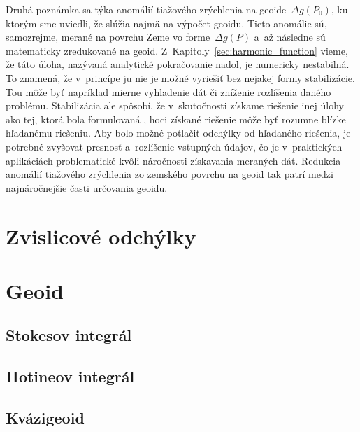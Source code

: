 \documentclass[a4paper,12pt]{book}
\begin{document}
Druhá poznámka sa týka anomálií tiažového zrýchlenia na geoide~$\Delta g(P_0)$, 
ku ktorým sme uviedli, že slúžia najmä na výpočet geoidu.  Tieto anomálie sú, 
samozrejme, merané na povrchu Zeme vo forme~$\Delta g(P)$ a~až následne sú 
matematicky zredukované na geoid.  Z~Kapitoly~\ref{sec:harmonic_function} 
vieme, že táto úloha, nazývaná analytické pokračovanie nadol, je numericky 
nestabilná.  To znamená, že v~princípe ju nie je možné vyriešiť bez nejakej 
formy stabilizácie.  Tou môže byť napríklad mierne vyhladenie dát či zníženie 
rozlíšenia daného problému.  Stabilizácia ale spôsobí, že v~skutočnosti získame 
riešenie inej úlohy ako tej, ktorá bola formulovaná 
\parencite{SansoGeodeticBoundaryValueProblem}, hoci získané riešenie môže byť 
rozumne blízke hľadanému riešeniu.  Aby bolo možné potlačiť odchýlky od 
hľadaného riešenia, je potrebné zvyšovať presnosť a~rozlíšenie vstupných 
údajov, čo je v~praktických aplikáciách problematické kvôli náročnosti 
získavania meraných dát.  Redukcia anomálií tiažového zrýchlenia zo zemského 
povrchu na geoid tak patrí medzi najnáročnejšie časti určovania geoidu.






\section{Zvislicové odchýlky}
\label{sec:deflections}






\section{Geoid}
\label{sec:geoid}


\subsection{Stokesov integrál}
\label{sec:stokes_integral}



\subsection{Hotineov integrál}
\label{sec:hotine_integral}



\subsection{Kvázigeoid}
\label{sec:quasigeoid}
\end{document}
